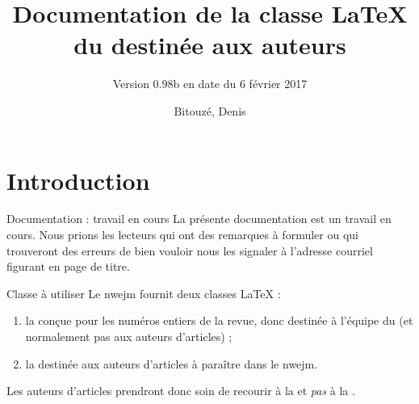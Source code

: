 \documentclass[french,nolocaltoc]{nwejmart}
\newtheorem[title=Fait,style=definition]{fact}
\begin{document}
\title[Documentation de la classe \LaTeX{} du
\texorpdfstring{\nwejm}{NWEJM}]{Documentation de la classe \LaTeX{} du \nwejm*{}
  destinée aux auteurs} \subtitle[short=Version 0.98b (06/02/2017)]{\small
  Version 0.98b en date du 6 février 2017}
%
\author[%
affiliation={%
  Université du Littoral Côte d'Opale, Laboratoire de mathématiques pures et
  appliquées (\nolinkurl{denis.bitouze@univ-littoral.fr})%
},%
]{Bitouzé, Denis}
%
\maketitle
%
\etocarticlestylenomarks
\localtableofcontents
%

\section{Introduction}
\label{sec-introduction}

\begin{dbremark}{Documentation : travail en cours}{}
  La présente documentation est un travail en cours. Nous prions les lecteurs
  qui ont des remarques à formuler ou qui trouveront des erreurs de bien vouloir
  nous les signaler à l'adresse courriel figurant en page de titre.
\end{dbremark}

\begin{dbwarning}{Classe à utiliser}{}
  Le \gls{nwejm} fournit deux classes \LaTeX{} :
  \begin{enumerate}
  \item la \nwejmcl{} conçue pour les numéros entiers de la revue, donc destinée
    à l'équipe du \nwejm{} (et normalement pas aux auteurs d'articles) ;
  \item la \nwejmauthorcl{} destinée aux auteurs d'articles à paraître dans le
    \gls{nwejm}.
  \end{enumerate}
  Les auteurs d'articles prendront donc soin de recourir à la \nwejmauthorcl{}
  et \emph{pas} à la \nwejmcl{}.
\end{dbwarning}
\end{document}
